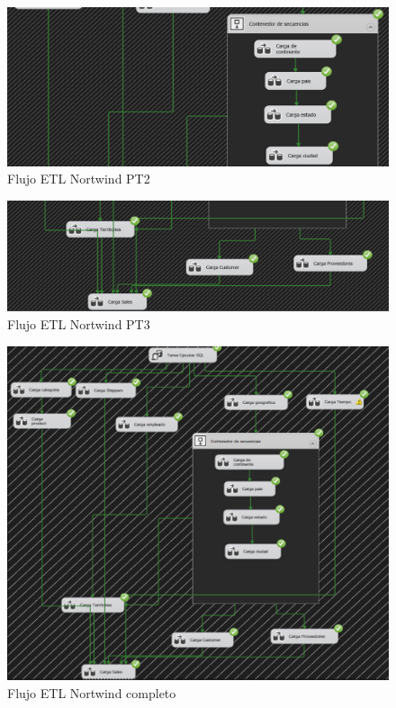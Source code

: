 \documentclass[12pt, a4paper, twoside]{article}
\begin{document}
	\begin{figure}[H]
		\centering
		\includegraphics[width=1\textwidth]{image/flujo_north_2.png}
		\caption{Flujo ETL Nortwind PT2}
		\label{fig:6}
	\end{figure}
	
	\begin{figure}[H]
		\centering
		\includegraphics[width=1\textwidth]{image/flujo_north_3.png}
		\caption{Flujo ETL Nortwind PT3}
		\label{fig:7}
	\end{figure}
	
	
	\begin{figure}[H]
		\centering
		\includegraphics[width=1\textwidth]{image/flujo_north_completo.png}
		\caption{Flujo ETL Nortwind completo}
		\label{fig:8}
	\end{figure}
	
\end{document}
